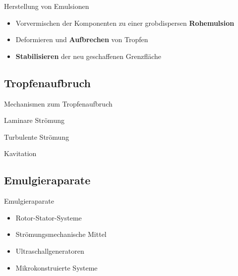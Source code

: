 \documentclass{beamer} %
\begin{document}
\begin{frame}{Herstellung von Emulsionen}
	\begin{block}{}
		\begin{itemize}
			\item Vorvermischen der Komponenten zu einer grobdispersen \textbf{Rohemulsion}\pause
			\item Deformieren und \textbf{Aufbrechen} von Tropfen\pause
			\item \textbf{Stabilisieren} der neu geschaffenen Grenzfläche
		\end{itemize}
	\end{block}
\end{frame}

\subsection{Tropfenaufbruch}

\begin{frame}{Mechanismen zum Tropfenaufbruch}
	
\end{frame}

\begin{frame}{Laminare Strömung}
	
\end{frame}

\begin{frame}{Turbulente Strömung}
	
\end{frame}

\begin{frame}{Kavitation}
	
\end{frame}

\subsection{Emulgieraparate}

\begin{frame}{Emulgieraparate}
	\begin{block}{}
		\begin{itemize}
			\item Rotor-Stator-Systeme \pause 
			\item Strömungsmechanische Mittel \pause
			\item Ultraschallgeneratoren \pause
			\item Mikrokonstruierte Systeme
		\end{itemize}
	\end{block}
\end{frame}
\end{document}
